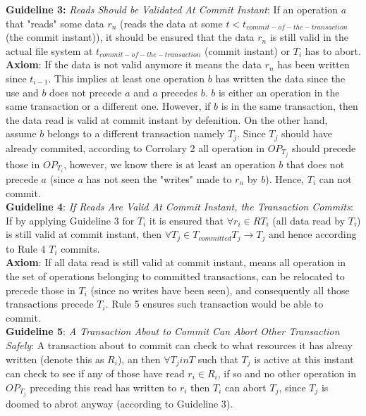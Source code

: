 \documentclass[a4paper, 11pt]{article}
\begin{document}
\textbf{Guideline 3:} \emph{Reads Should be Validated At Commit Instant}:
If an operation $a$ that "reads" some data $r_n$ (reads the data at some $t < t_{commit-of-the-transaction}$(the commit instant)), it should be ensured that the data $r_n$ is still valid in the actual file system at $t_{commit-of-the-transaction}$ (commit instant) or $T_i$ has to abort.\\

\textbf{Axiom}: If the data is not valid anymore it means the data $r_n$ has been written since $t_{i-1}$. This implies at least one operation $b$ has written the data since the use and $b$ does not precede $a$ and $a$ precedes $b$. $b$ is either an operation in the same transaction or a different one. However, if $b$ is in the same transaction, then the data read is valid at commit instant by defenition. On the other hand, assume $b$ belongs to a different transaction namely $T_j$. Since $T_j$ should have already commited, according to Corrolary 2 all operation in $OP_{T_j}$ should precede those in $OP_{T_i}$, however, we know there is at least an operation $b$ that does not precede $a$ (since $a$ has not seen the "writes" made to $r_n$ by $b$). Hence, $T_i$ can not commit.\\


\textbf{Guideline 4}: \emph{If Reads Are Valid At Commit Instant, the Transaction Commits}: If by applying Guideline 3 for $T_i$ it is ensured that $\forall r_i \in R{T_i}$ (all data read by $T_i$) is still valid at commit instant, then $\forall T_j \in T_{committed} T_j \rightarrow T_j$ and hence according to Rule 4 $T_i$ commits.\\

\textbf{Axiom}: If all data read is still valid at commit instant, means all operation in the set of operations belonging to committed transactions, can be relocated to precede those in $T_i$ (since no writes have been seen), and consequently all those transactions precede $T_i$. Rule 5 ensures such transaction would be able to commit.\\ 

\textbf{Guideline 5}: \emph{A Transaction About to Commit Can Abort Other Transaction Safely}: A transaction about to commit can check to what resources it has alreay written (denote this as $R_i$), an then $\forall T_j in T$  such that $T_j$ is active at this instant can check to see if any of those have read $r_i \in R_i$, if so and no other operation in $OP_{T_j}$ preceding this read has written to $r_i$ then $T_i$ can abort $T_j$, since $T_j$ is doomed to abrot anyway (according to Guideline 3).\\ 
 
\end{document}
